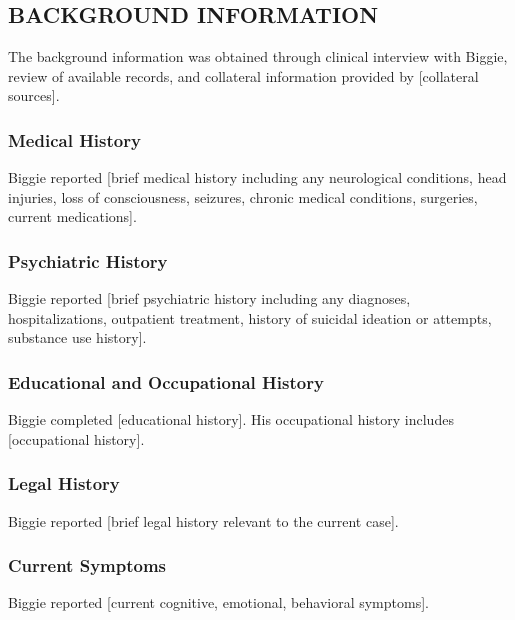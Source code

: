 \documentclass[
  letterpaper,
  DIV=11,
  numbers=noendperiod]{scrartcl}
\begin{document}
\subsection{BACKGROUND INFORMATION}\label{background-information}

The background information was obtained through clinical interview with
Biggie, review of available records, and collateral information provided
by {[}collateral sources{]}.

\subsubsection{Medical History}\label{medical-history}

Biggie reported {[}brief medical history including any neurological
conditions, head injuries, loss of consciousness, seizures, chronic
medical conditions, surgeries, current medications{]}.

\subsubsection{Psychiatric History}\label{psychiatric-history}

Biggie reported {[}brief psychiatric history including any diagnoses,
hospitalizations, outpatient treatment, history of suicidal ideation or
attempts, substance use history{]}.

\subsubsection{Educational and Occupational
History}\label{educational-and-occupational-history}

Biggie completed {[}educational history{]}. His occupational history
includes {[}occupational history{]}.

\subsubsection{Legal History}\label{legal-history}

Biggie reported {[}brief legal history relevant to the current case{]}.

\subsubsection{Current Symptoms}\label{current-symptoms}

Biggie reported {[}current cognitive, emotional, behavioral symptoms{]}.
\end{document}
